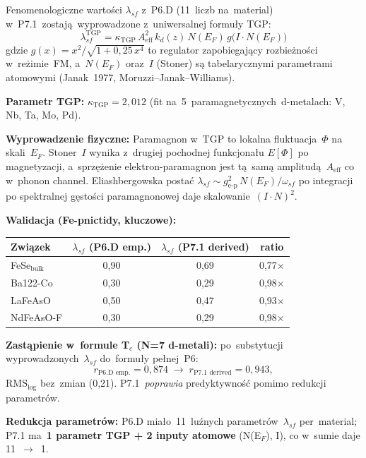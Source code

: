 Fenomenologiczne warto\'sci $\lambda_{sf}$ z~P6.D (11~liczb na~material)
w~P7.1~zostaj\k{a}~wyprowadzone z~uniwersalnej formu\l{}y TGP:
\[
\boxed{\;\lambda_{sf}^\text{TGP} = \kappa_\text{TGP}\,A_\text{eff}^2\,k_d(z)\,N(E_F)\,g\!\bigl(I\cdot N(E_F)\bigr)\;}
\]
gdzie $g(x)\!=\!x^2/\sqrt{1+0{,}25\,x^4}$ to regulator zapobiegaj\k{a}cy
rozbie\.zno\'sci w~re\.zimie~FM, a~$N(E_F)$ oraz~$I$ (Stoner) s\k{a}
tabelarycznymi parametrami atomowymi (Janak~1977, Moruzzi--Janak--Williams).

\medskip\noindent\textbf{Parametr TGP:} $\kappa_\text{TGP}\!=\!2{,}012$
(fit na~5~paramagnetycznych~d-metalach: V, Nb, Ta, Mo, Pd).

\medskip\noindent\textbf{Wyprowadzenie fizyczne:} Paramagnon w~TGP to
lokalna fluktuacja~$\Phi$ na skali~$E_F$. Stoner~$I$ wynika z~drugiej
pochodnej funkcjona\l{}u $E[\Phi]$ po magnetyzacji, a~sprz\k{e}\.zenie
elektron-paramagnon jest t\k{a}~sam\k{a} amplitud\k{a}~$A_\text{eff}$ co
w~phonon channel. Eliashbergowska posta\'c
$\lambda_{sf}\sim g_\text{e-p}^2\,N(E_F)/\omega_{sf}$
po integracji po spektralnej g\k{e}sto\'sci paramagnonowej daje
skalowanie~$(I\cdot N)^2$.

\medskip\noindent\textbf{Walidacja (Fe-pnictidy, kluczowe):}
\begin{center}
\small
\begin{tabular}{lccc}
\hline
Zwi\k{a}zek & $\lambda_{sf}$ (P6.D emp.) & $\lambda_{sf}$ (P7.1 derived) & ratio \\
\hline
FeSe$_\text{bulk}$  & 0,90 & 0,69 & 0,77$\times$ \\
Ba122-Co            & 0,30 & 0,29 & 0,98$\times$ \\
LaFeAsO             & 0,50 & 0,47 & 0,93$\times$ \\
NdFeAsO-F           & 0,30 & 0,29 & 0,98$\times$ \\
\hline
\end{tabular}
\end{center}

\medskip\noindent\textbf{Zast\k{a}pienie w~formule T$_c$ (N=7 d-metali):}
po~substytucji wyprowadzonych~$\lambda_{sf}$ do~formu\l{}y pe\l{}nej~P6:
\[
r_\text{P6.D emp.}\!=\!0{,}874\;\longrightarrow\;
r_\text{P7.1 derived}\!=\!0{,}943,
\]
$\text{RMS}_\text{log}$ bez~zmian (0,21). P7.1~\emph{poprawia}
predyktywno\'s\'c pomimo redukcji parametr\'ow.

\medskip\noindent\textbf{Redukcja parametr\'ow:} P6.D mia\l{}o~11~lu\'znych
parametr\'ow~$\lambda_{sf}$ per~material; P7.1 ma~\textbf{1 parametr TGP
+ 2 inputy atomowe} (N(E$_F$), I), co w~sumie daje 11~$\to$~1.

